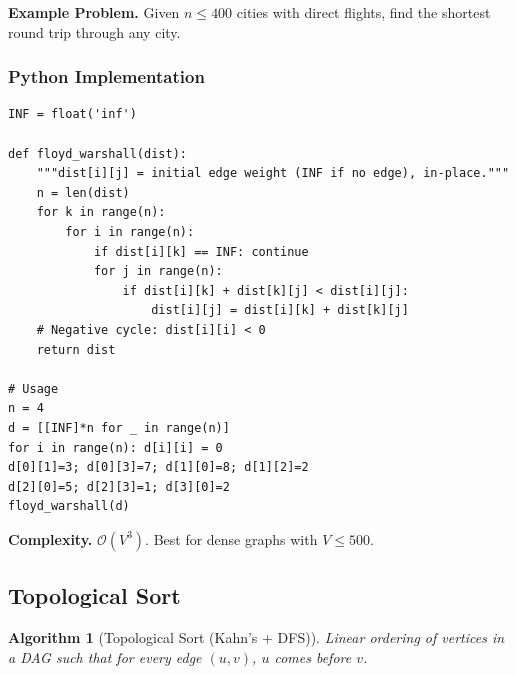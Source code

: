 \documentclass[10pt,a4paper]{article}
\theoremstyle{cpstyle}
\newtheorem{algorithm}[theorem]{Algorithm}
\newcommand{\bigO}[1]{\mathcal{O}\!\left(#1\right)}
\begin{document}
\textbf{Example Problem.} Given $n \leq 400$ cities with direct flights, find the shortest round trip through any city.

\subsubsection{Python Implementation}
\begin{lstlisting}[caption={Floyd-Warshall all-pairs shortest paths}]
INF = float('inf')

def floyd_warshall(dist):
    """dist[i][j] = initial edge weight (INF if no edge), in-place."""
    n = len(dist)
    for k in range(n):
        for i in range(n):
            if dist[i][k] == INF: continue
            for j in range(n):
                if dist[i][k] + dist[k][j] < dist[i][j]:
                    dist[i][j] = dist[i][k] + dist[k][j]
    # Negative cycle: dist[i][i] < 0
    return dist

# Usage
n = 4
d = [[INF]*n for _ in range(n)]
for i in range(n): d[i][i] = 0
d[0][1]=3; d[0][3]=7; d[1][0]=8; d[1][2]=2
d[2][0]=5; d[2][3]=1; d[3][0]=2
floyd_warshall(d)
\end{lstlisting}

\textbf{Complexity.} $\bigO{V^3}$. Best for dense graphs with $V \leq 500$.

\subsection{Topological Sort}

\begin{algorithm}[Topological Sort (Kahn's + DFS)]
Linear ordering of vertices in a DAG such that for every edge $(u,v)$, $u$ comes before $v$.
\end{algorithm}
\end{document}
